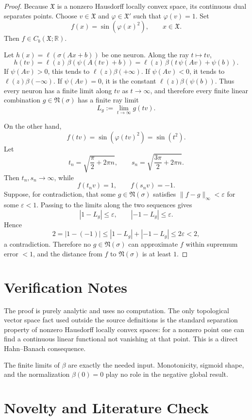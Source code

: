 \documentclass[11pt]{article}
\newcommand{\X}{\mathfrak X}
\newcommand{\N}{\mathfrak N}
\newcommand{\R}{\mathbb R}
\newcommand{\Cb}{C_b}
\begin{document}
\begin{proof}
Because \(\X\) is a nonzero Hausdorff locally convex space, its continuous
dual separates points. Choose \(v\in\X\) and \(\varphi\in\X'\) such that
\(\varphi(v)=1\). Set
\[
  f(x)=\sin(\varphi(x)^2),\qquad x\in\X.
\]
Then \(f\in \Cb(\X;\R)\).

Let \(h(x)=\ell(\sigma(Ax+b))\) be one neuron. Along the ray \(t\mapsto tv\),
\[
  h(tv)
  =\ell(z)\,\beta(\psi(A(tv)+b))
  =\ell(z)\,\beta(t\,\psi(Av)+\psi(b)).
\]
If \(\psi(Av)>0\), this tends to \(\ell(z)\beta(+\infty)\). If
\(\psi(Av)<0\), it tends to \(\ell(z)\beta(-\infty)\). If
\(\psi(Av)=0\), it is the constant \(\ell(z)\beta(\psi(b))\). Thus every
neuron has a finite limit along \(tv\) as \(t\to\infty\), and therefore every
finite linear combination \(g\in\N(\sigma)\) has a finite ray limit
\[
  L_g:=\lim_{t\to\infty}g(tv).
\]

On the other hand,
\[
  f(tv)=\sin(\varphi(tv)^2)=\sin(t^2).
\]
Let
\[
  t_n=\sqrt{\frac{\pi}{2}+2\pi n},
  \qquad
  s_n=\sqrt{\frac{3\pi}{2}+2\pi n}.
\]
Then \(t_n,s_n\to\infty\), while
\[
  f(t_n v)=1,\qquad f(s_n v)=-1.
\]
Suppose, for contradiction, that some \(g\in\N(\sigma)\) satisfies
\(\|f-g\|_\infty<\varepsilon\) for some \(\varepsilon<1\). Passing to the
limits along the two sequences gives
\[
  |1-L_g|\le \varepsilon,
  \qquad
  |-1-L_g|\le \varepsilon.
\]
Hence
\[
  2=|1-(-1)|\le |1-L_g|+|-1-L_g|\le 2\varepsilon<2,
\]
a contradiction. Therefore no \(g\in\N(\sigma)\) can approximate \(f\) within
supremum error \(<1\), and the distance from \(f\) to \(\N(\sigma)\) is at
least \(1\).
\end{proof}

\section*{Verification Notes}

The proof is purely analytic and uses no computation. The only topological
vector space fact used outside the source definitions is the standard
separation property of nonzero Hausdorff locally convex spaces: for a nonzero
point one can find a continuous linear functional not vanishing at that point.
This is a direct Hahn--Banach consequence.

The finite limits of \(\beta\) are exactly the needed input. Monotonicity,
sigmoid shape, and the normalization \(\beta(0)=0\) play no role in the
negative global result.

\section*{Novelty and Literature Check}
\end{document}
